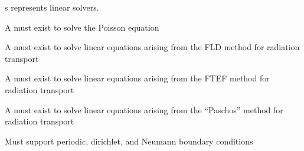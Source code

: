 \documentclass[11pt]{article}
\begin{document}
s represents linear solvers.

\BeginENUMERATE
\item  A   must exist to solve the Poisson equation
\item  A   must exist to solve linear equations arising from the FLD method for radiation transport
\item  A   must exist to solve linear equations arising from the FTEF method for radiation transport
\item  A   must exist to solve linear equations arising from the ``Paschos'' method for radiation transport
\item Must support periodic, dirichlet, and Neumann boundary conditions
\EndENUMERATE


\end{document}
